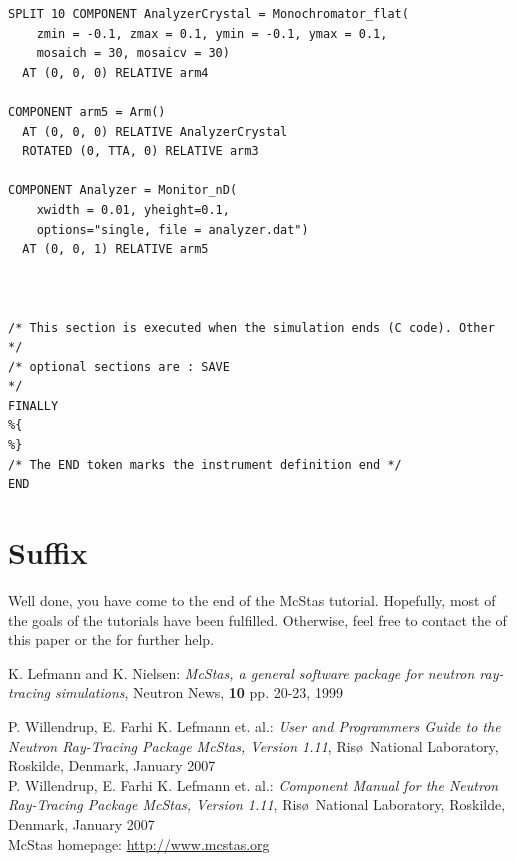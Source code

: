 \begin{verbatim}
SPLIT 10 COMPONENT AnalyzerCrystal = Monochromator_flat(
    zmin = -0.1, zmax = 0.1, ymin = -0.1, ymax = 0.1,
    mosaich = 30, mosaicv = 30)
  AT (0, 0, 0) RELATIVE arm4

COMPONENT arm5 = Arm()
  AT (0, 0, 0) RELATIVE AnalyzerCrystal
  ROTATED (0, TTA, 0) RELATIVE arm3

COMPONENT Analyzer = Monitor_nD(
    xwidth = 0.01, yheight=0.1, 
    options="single, file = analyzer.dat")
  AT (0, 0, 1) RELATIVE arm5



/* This section is executed when the simulation ends (C code). Other    */
/* optional sections are : SAVE                                         */
FINALLY
%{
%}
/* The END token marks the instrument definition end */
END
\end{verbatim}
\section{Suffix}
Well done, you have come to the end of the McStas tutorial. Hopefully,
most of the goals of the tutorials have been fulfilled. Otherwise,
feel free to contact the
of this paper or the  for further help.

\begin{thebibliography}{10}
K. Lefmann and K. Nielsen: \emph{McStas, a general software package
  for neutron ray-tracing simulations}, Neutron News, {\bf 10} pp. 20-23, 1999

P. Willendrup, E. Farhi K. Lefmann et. al.: \emph{User and Programmers
  Guide to the Neutron Ray-Tracing Package McStas, Version 1.11}, Ris\o\
National Laboratory, Roskilde, Denmark, January 2007\\
P. Willendrup, E. Farhi K. Lefmann et. al.: \emph{Component Manual for
 the Neutron Ray-Tracing Package McStas, Version 1.11}, Ris\o\
National Laboratory, Roskilde, Denmark, January 2007\\

McStas homepage: \url{http://www.mcstas.org}\\
\end{thebibliography}


